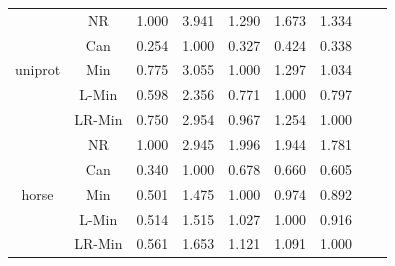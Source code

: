 \documentclass[11pt]{book}
\begin{document}
\begin{table}
\begin{tabular}{|c|c|c|c|c|c|c|c|c|}
    \hline
    \multirow{5}{*}{uniprot}
         & NR & 1.000 & 3.941 & 1.290 & 1.673 & 1.334 \\                                                                                                                                                             
         & Can & 0.254 & 1.000 & 0.327 & 0.424 & 0.338 \\                                                                                                                                                            
         & Min & 0.775 & 3.055 & 1.000 & 1.297 & 1.034 \\                                                                                                                                                            
         & L-Min & 0.598 & 2.356 & 0.771 & 1.000 & 0.797 \\                                                                                                                                                          
         & LR-Min & 0.750 & 2.954 & 0.967 & 1.254 & 1.000 \\
    
    \hline
    \multirow{5}{*}{horse}
         & NR & 1.000 & 2.945 & 1.996 & 1.944 & 1.781 \\                                                                                                                                                             
         & Can & 0.340 & 1.000 & 0.678 & 0.660 & 0.605 \\                                                                                                                                                            
         & Min & 0.501 & 1.475 & 1.000 & 0.974 & 0.892 \\                                                                                                                                                            
         & L-Min & 0.514 & 1.515 & 1.027 & 1.000 & 0.916 \\                                                                                                                                                          
         & LR-Min & 0.561 & 1.653 & 1.121 & 1.091 & 1.000 \\  
    

\end{tabular}
\end{table}
\end{document}
